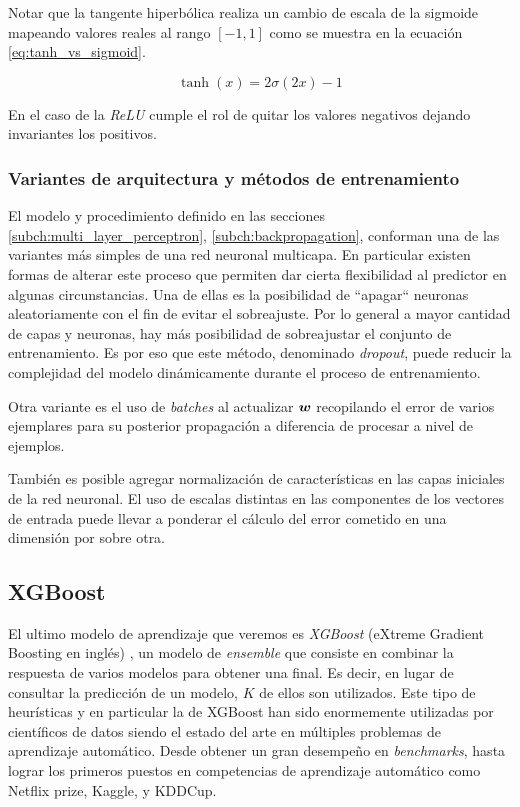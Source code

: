 Notar que la tangente hiperbólica realiza un cambio de escala de la sigmoide
mapeando valores reales al rango $[-1, 1]$ como se muestra en la ecuación
\ref{eq:tanh_vs_sigmoid}.

\begin{equation} \label{eq:tanh_vs_sigmoid}
    \tanh\left( x \right) = 2 \sigma(2x) - 1
\end{equation}

En el caso de la \emph{ReLU} cumple el rol de quitar los valores negativos
dejando invariantes los positivos.

\subsubsection{Variantes de arquitectura y métodos de entrenamiento}

El modelo y procedimiento definido en las secciones
\ref{subch:multi_layer_perceptron}, \ref{subch:backpropagation}, conforman una
de las variantes más simples de una red neuronal multicapa. En particular
existen formas de alterar este proceso que permiten dar cierta flexibilidad al
predictor en algunas circunstancias. Una de ellas es la posibilidad de
``apagar`` neuronas aleatoriamente con el fin de evitar el sobreajuste. Por lo
general a mayor cantidad de capas y neuronas, hay más posibilidad de
sobreajustar el conjunto de entrenamiento. Es por eso que este método,
denominado \emph{dropout}, puede reducir la complejidad del modelo dinámicamente
durante el proceso de entrenamiento.

Otra variante es el uso de \emph{batches} al actualizar $\boldsymbol{w}$ recopilando
el error de varios ejemplares para su posterior propagación a diferencia de
procesar a nivel de ejemplos.

También es posible agregar normalización de características en las capas
iniciales de la red neuronal. El uso de escalas distintas en las componentes de
los vectores de entrada puede llevar a ponderar el cálculo del error cometido en
una dimensión por sobre otra.

\subsection{XGBoost}
\label{alg:xgboost}

El ultimo modelo de aprendizaje que veremos es \emph{XGBoost} (eXtreme Gradient
Boosting en inglés) \citep{Chen-2016}, un modelo de \emph{ensemble} que consiste
en combinar la respuesta de varios modelos para obtener una final. Es decir, en
lugar de consultar la predicción de un modelo, $K$ de ellos son utilizados. Este
tipo de heurísticas y en particular la de XGBoost han sido enormemente
utilizadas por científicos de datos siendo el estado del arte en múltiples
problemas de aprendizaje automático. Desde obtener un gran desempeño en
\emph{benchmarks}, hasta lograr los primeros puestos en competencias de
aprendizaje automático como Netflix prize, Kaggle, y KDDCup.

